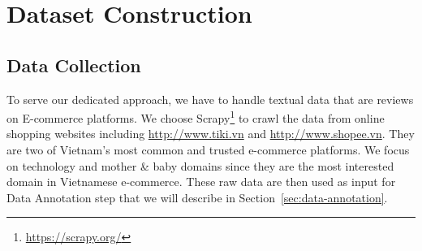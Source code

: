 \chapter{Dataset Construction}
\label{chap:dataset-construction}


\section{Data Collection}
\label{sec:data-collection}

To serve our dedicated approach, we have to handle textual data that are reviews on E-commerce platforms. We choose Scrapy\footnote{\url{https://scrapy.org/}} to crawl the data from online shopping websites including \url{http://www.tiki.vn} and \url{http://www.shopee.vn}. They are two of Vietnam's most common and trusted e-commerce platforms.
We focus on technology and mother \& baby domains since they are the most interested domain in Vietnamese e-commerce.
These raw data are then used as input for Data Annotation step that we will describe in Section~\ref{sec:data-annotation}.

